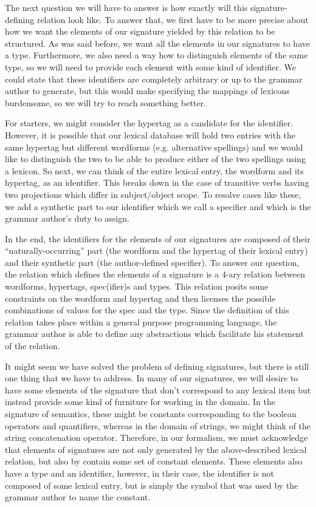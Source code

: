 The next question we will have to answer is how exactly will this
signature-defining relation look like. To answer that, we first have
to be more precise about how we want the elements of our signature
yielded by this relation to be structured. As was said before, we want
all the elements in our signatures to have a type. Furthermore, we
also need a way how to distinguish elements of the same type, so we
will need to provide each element with some kind of identifier. We
could state that these identifiers are completely arbitrary or up to
the grammar author to generate, but this would make specifying the
mappings of lexicons burdensome, so we will try to reach something
better.

For starters, we might consider the hypertag as a candidate for the
identifier. However, it is possible that our lexical database will
hold two entries with the same hypertag but different wordforms (e.g.
alternative spellings) and we would like to distinguish the two to be
able to produce either of the two spellings using a lexicon. So next,
we can think of the entire lexical entry, the wordform and its
hypertag, as an identifier. This breaks down in the case of transitive
verbs having two projections which differ in subject/object scope. To
resolve cases like these, we add a synthetic part to our identifier
which we call a specifier and which is the grammar author's duty to
assign.

In the end, the identifiers for the elements of our signatures are
composed of their ``naturally-occurring'' part (the wordform and the
hypertag of their lexical entry) and their synthetic part (the
author-defined specifier). To answer our question, the relation which
defines the elements of a signature is a 4-ary relation between
wordforms, hypertags, spec(ifier)s and types. This relation posits
some constraints on the wordform and hypertag and then licenses the
possible combinations of values for the spec and the type. Since the
definition of this relation takes place within a general purpose
programming language, the grammar author is able to define any
abstractions which facilitate his statement of the relation.

It might seem we have solved the problem of defining signatures, but
there is still one thing that we have to address. In many of our
signatures, we will desire to have some elements of the signature that
don't correspond to any lexical item but instead provide some kind of
furniture for working in the domain. In the signature of semantics,
these might be constants corresponding to the boolean operators and
quantifiers, whereas in the domain of strings, we might think of the
string concatenation operator. Therefore, in our formalism, we must
acknowledge that elements of signatures are not only generated by the
above-described lexical relation, but also by contain some set of
constant elements. These elements also have a type and an identifier,
however, in their case, the identifier is not composed of some lexical
entry, but is simply the symbol that was used by the grammar author to
name the constant.

